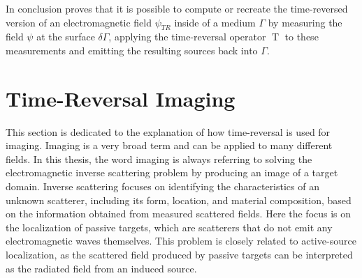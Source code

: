 In conclusion \parencite{de_rosny_theory_2010} proves that it is possible to compute or recreate the time-reversed version of an electromagnetic field \(\psi_{TR}\) inside of a medium \(\Gamma \) by measuring the field \(\psi \) at the surface \(\delta \Gamma \), applying the time-reversal operator \(\operatorname{T}\) to these measurements and emitting the resulting sources back into \(\Gamma \).



\section{Time-Reversal Imaging}
This section is dedicated to the explanation of how time-reversal is used for imaging.
Imaging is a very broad term and can be applied to many different fields.
In this thesis, the word imaging is always referring to solving the electromagnetic inverse scattering problem by producing an image of a target domain.
Inverse scattering focuses on identifying the characteristics of an unknown scatterer, including its form, location, and material composition, based on the information obtained from measured scattered fields.
Here the focus is on the localization of passive targets, which are scatterers that do not emit any electromagnetic waves themselves.
This problem is closely related to active-source localization, as the scattered field produced by passive targets can be interpreted as the radiated field from an induced source.~\parencite{chen_computational_2018}

